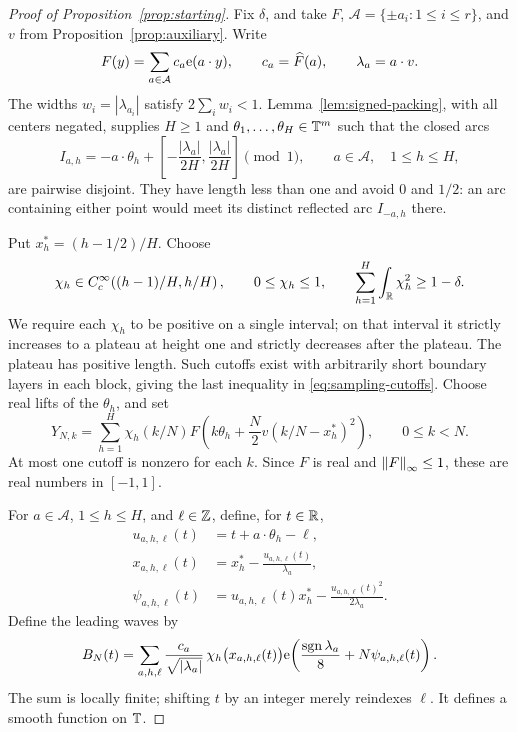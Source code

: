 \begin{proof}[Proof of Proposition~\ref{prop:starting}]
Fix $\delta$, and take $F$, $\mathcal A=\{\pm a_i:1\le i\le r\}$,
and $v$ from Proposition~\ref{prop:auxiliary}.  Write
\[
 F(y)=\sum_{a\in\mathcal A}c_a\mathrm e(a\cdot y),
 \qquad c_a=\widehat F(a),\qquad \lambda_a=a\cdot v.
\]
The widths $w_i=|\lambda_{a_i}|$ satisfy
$2\sum_iw_i<1$.  Lemma~\ref{lem:signed-packing}, with all centers
negated, supplies $H\ge1$ and $\theta_1,\ldots,\theta_H\in\mathbb T^m$
such that the closed arcs
\begin{equation}
 \label{eq:sampling-packed-intervals}
 I_{a,h}=-a\cdot\theta_h+
 \left[-\frac{|\lambda_a|}{2H},\frac{|\lambda_a|}{2H}\right]
 \pmod1,
 \qquad a\in\mathcal A,\quad 1\le h\le H,
\end{equation}
are pairwise disjoint.  They have length less than one and avoid
$0$ and $1/2$: an arc containing either point would meet its distinct
reflected arc $I_{-a,h}$ there.

Put $x_h^*=(h-1/2)/H$.  Choose
\begin{equation}
 \label{eq:sampling-cutoffs}
 \chi_h\in C_c^\infty\!\left((h-1)/H,h/H\right),\qquad
 0\le\chi_h\le1,\qquad
 \sum_{h=1}^H\int_\mathbb R\chi_h^2\ge1-\delta.
\end{equation}
We require each $\chi_h$ to be positive on a single interval; on that
interval it strictly increases to a plateau at height one and strictly
decreases after the plateau.  The plateau has positive length.  Such cutoffs
exist with arbitrarily short boundary layers in each block, giving
the last inequality in \eqref{eq:sampling-cutoffs}.
Choose real lifts of the $\theta_h$, and set
\begin{equation}
 \label{eq:sampling-coefficients}
 Y_{N,k}=\sum_{h=1}^H\chi_h(k/N)
 F\!\left(k\theta_h+
       \frac N2v(k/N-x_h^*)^2\right),\qquad 0\le k<N.
\end{equation}
At most one cutoff is nonzero for each $k$.  Since $F$ is real and
$\left\lVert F\right\rVert_\infty\le1$, these are real numbers in $[-1,1]$.

For $a\in\mathcal A$, $1\le h\le H$, and $\ell\in\mathbb Z$, define, for
$t\in\mathbb R$,
\begin{equation}
 \label{eq:sampling-phases}
 \begin{split}
 u_{a,h,\ell}(t)&=t+a\cdot\theta_h-\ell,\\
 x_{a,h,\ell}(t)&=x_h^*-
                      \frac{u_{a,h,\ell}(t)}{\lambda_a},\\
 \psi_{a,h,\ell}(t)&=u_{a,h,\ell}(t)x_h^*
                      -\frac{u_{a,h,\ell}(t)^2}{2\lambda_a}.
 \end{split}
\end{equation}
Define the leading waves by
\begin{equation}
 \label{eq:sampling-leading-waves}
 B_N(t)=\sum_{a,h,\ell}
 \frac{c_a}{\sqrt{|\lambda_a|}}\,
 \chi_h\bigl(x_{a,h,\ell}(t)\bigr)
 \mathrm e\!\left(\frac{\operatorname{sgn}\lambda_a}{8}
                  +N\psi_{a,h,\ell}(t)\right).
\end{equation}
The sum is locally finite; shifting $t$ by an integer merely
reindexes $\ell$.  It defines a smooth function on $\mathbb T$.


\end{proof}
